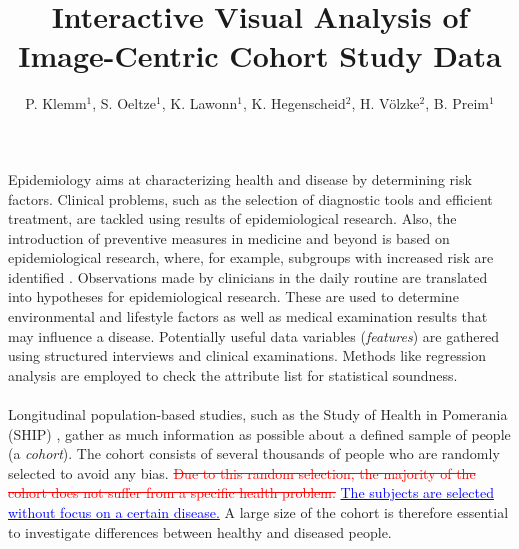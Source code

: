 \documentclass[journal]{style/vgtc} 			          %
\title{Interactive Visual Analysis of Image-Centric Cohort Study Data}
\author{P. Klemm$^{1}$, S. Oeltze$^{1}$, K. Lawonn$^{1}$, K. Hegenscheid$^{2}$, H. V{\"o}lzke$^{2}$, B. Preim$^{1}$}
\newcommand{\rem}[1]{\textcolor{red}{\sout{#1}}}
\newcommand{\add}[1]{\textcolor{blue}{\uline{#1}}}
\begin{document}


\maketitle

Epidemiology aims at characterizing health and disease by determining risk factors.
%
Clinical problems, such as the selection of diagnostic tools and efficient treatment, are tackled using results of epidemiological research.
%
Also, the introduction of preventive measures in medicine and beyond is based on epidemiological research, where, for example, subgroups with increased risk are identified \cite{Fletcher2012}.
%
Observations made by clinicians in the daily routine are translated into hypotheses for epidemiological research.
%
These are used to determine environmental and lifestyle factors as well as medical examination results that may influence a disease.
%
Potentially useful data variables (\emph{features}) are gathered using structured interviews and clinical examinations.
%
Methods like regression analysis are employed to check the attribute list for statistical soundness.
%
\\\\
Longitudinal population-based studies, such as the Study of Health in Pomerania (SHIP) \cite{Volzke2011}, gather as much information as possible about a defined sample of people (a \emph{cohort}).
%
The cohort consists of several thousands of people who are randomly selected to avoid any bias.
%
\rem{Due to this random selection, the majority of the cohort does not suffer from a specific health problem.}
\add{The subjects are selected without focus on a certain disease.}
%
A large size of the cohort is therefore essential to investigate differences between healthy and diseased people.
%
\end{document}
